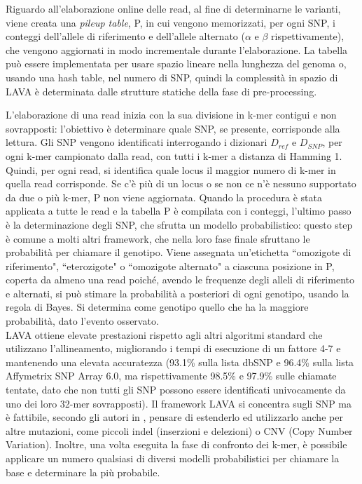 \documentclass[../main.tex]{subfiles}
\begin{document}
Riguardo all'elaborazione online delle read, al fine di determinarne le varianti, viene creata una \textit{pileup table}, P, in cui vengono memorizzati, per ogni SNP, i conteggi dell'allele di riferimento e dell'allele alternato ($\alpha$ e $\beta$ rispettivamente), che vengono aggiornati in modo incrementale durante l'elaborazione. La tabella può essere implementata per usare spazio lineare nella lunghezza del genoma o, usando una hash table, nel numero di SNP, quindi la complessità in spazio di LAVA è determinata dalle strutture statiche della fase di pre-processing.

L'elaborazione di una read inizia con la sua divisione in k-mer contigui e non sovrapposti: l'obiettivo è determinare quale SNP, se presente, corrisponde alla lettura. Gli SNP vengono identificati interrogando i dizionari $D_{ref}$ e $D_{SNP}$, per ogni k-mer campionato dalla read, con tutti i k-mer a distanza di Hamming 1. Quindi, per ogni read, si identifica quale locus il maggior numero di k-mer in quella read corrisponde. Se c'è più di un locus o se non ce n'è nessuno supportato da due o più k-mer, P non viene aggiornata. Quando la procedura è stata applicata a tutte le read e la tabella P è compilata con i conteggi, l'ultimo passo è la determinazione degli SNP, che sfrutta un modello probabilistico: questo step è comune a molti altri framework, che nella loro fase finale sfruttano le probabilità per chiamare il genotipo. Viene assegnata un'etichetta ``omozigote di riferimento", ``eterozigote" o ``omozigote alternato" a ciascuna posizione in P, coperta da almeno una read poiché, avendo le frequenze degli alleli di riferimento e alternati, si può stimare la probabilità a posteriori di ogni genotipo, usando la regola di Bayes. Si determina come genotipo quello che ha la maggiore probabilità, dato l'evento osservato. \\

LAVA ottiene elevate prestazioni rispetto agli altri algoritmi standard che utilizzano l'allineamento, migliorando i tempi di esecuzione di un fattore 4-7 e mantenendo una elevata accuratezza (93.1\% sulla lista dbSNP e 96.4\% sulla lista Affymetrix SNP Array 6.0, ma rispettivamente 98.5\% e 97.9\% sulle chiamate tentate, dato che non tutti gli SNP possono essere identificati univocamente da uno dei loro 32-mer sovrapposti).
Il framework LAVA si concentra sugli SNP ma è fattibile, secondo gli autori in  \cite{shajii2016lava}, pensare di estenderlo ed utilizzarlo anche per altre mutazioni, come piccoli indel (inserzioni e delezioni) o CNV (Copy Number Variation). Inoltre, una volta eseguita la fase di confronto dei k-mer, è possibile applicare un numero qualsiasi di diversi modelli probabilistici per chiamare la base e determinare la più probabile. 
\end{document}

